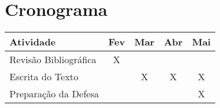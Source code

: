 \section{Cronograma}

\begin{center}
	\begin{tabular}{|l||c||c||c||c|}
		\hline
		Atividade &Fev &Mar &Abr &Mai\\
		\hline
		Revisão Bibliográfica &X & & &\\
		\hline
		Escrita do Texto & &X &X &X\\
		\hline
		Preparação da Defesa & & & &X\\
		\hline
	\end{tabular}\\
\end{center}
